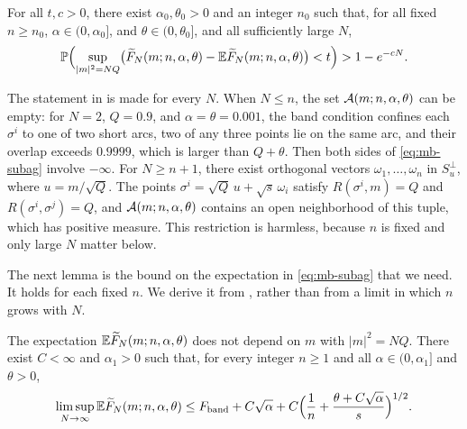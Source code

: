 \begin{theorem}\label{thm:mb-subag}
For all $t,c>0$, there exist $\alpha_0,\theta_0>0$ and an integer $n_0$ such that, for all fixed $n\ge n_0$, $\alpha\in(0,\alpha_0]$, and $\theta\in(0,\theta_0]$, and all sufficiently large $N$,
\begin{equation}\label{eq:mb-subag}
\mathbb P\Bigl(\sup_{|m|^2=NQ}\bigl(\widetilde F_N(m;n,\alpha,\theta)-\mathbb E\widetilde F_N(m;n,\alpha,\theta)\bigr)<t\Bigr)>1-e^{-cN}.
\end{equation}
\end{theorem}

The statement in \cite{Subag2024} is made for every $N$. When $N\le n$, the set $\mathcal A(m;n,\alpha,\theta)$ can be empty: for $N=2$, $Q=0.9$, and $\alpha=\theta=0.001$, the band condition confines each $\sigma^i$ to one of two short arcs, two of any three points lie on the same arc, and their overlap exceeds $0.9999$, which is larger than $Q+\theta$. Then both sides of \eqref{eq:mb-subag} involve $-\infty$. For $N\ge n+1$, there exist orthogonal vectors $\omega_1,\dots,\omega_n$ in $S_u^\perp$, where $u=m/\sqrt Q$. The points $\sigma^i=\sqrt Q\,u+\sqrt s\,\omega_i$ satisfy $R(\sigma^i,m)=Q$ and $R(\sigma^i,\sigma^j)=Q$, and $\mathcal A(m;n,\alpha,\theta)$ contains an open neighborhood of this tuple, which has positive measure. This restriction is harmless, because $n$ is fixed and only large $N$ matter below.

The next lemma is the bound on the expectation in \eqref{eq:mb-subag} that we need. It holds for each fixed $n$. We derive it from \cite[Lemmas~18 and~19]{Subag2024}, rather than from a limit in which $n$ grows with $N$.

\begin{lemma}\label{lem:mb-subag-mean}
The expectation $\mathbb E\widetilde F_N(m;n,\alpha,\theta)$ does not depend on $m$ with $|m|^2=NQ$. There exist $C<\infty$ and $\alpha_1>0$ such that, for every integer $n\ge1$ and all $\alpha\in(0,\alpha_1]$ and $\theta>0$,
\begin{equation}\label{eq:mb-subag-mean}
\limsup_{N\to\infty}\mathbb E\widetilde F_N(m;n,\alpha,\theta)\le F_{\mathrm{band}}+C\sqrt\alpha+C\Bigl(\frac1n+\frac{\theta+C\sqrt\alpha}s\Bigr)^{1/2}.
\end{equation}
\end{lemma}


